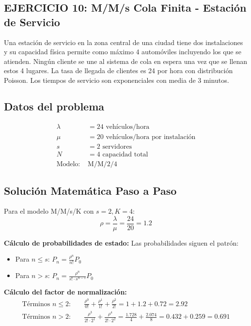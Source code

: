 \documentclass[12pt, a4paper, oneside]{book}
\theoremstyle{definition}
\begin{document}
\begin{center}
\begin{center}
\begin{center}
\section{EJERCICIO 10: M/M/s Cola Finita - Estación de Servicio}

Una estación de servicio en la zona central de una ciudad tiene dos instalaciones y su capacidad física permite como máximo 4 automóviles incluyendo los que se atienden. Ningún cliente se une al sistema de cola en espera una vez que se llenan estos 4 lugares. La tasa de llegada de clientes es 24 por hora con distribución Poisson. Los tiempos de servicio son exponenciales con media de 3 minutos.

\subsection{Datos del problema}
\begin{align*}
\lambda &= 24 \text{ vehículos/hora} \\
\mu &= 20 \text{ vehículos/hora por instalación} \\
s &= 2 \text{ servidores} \\
N &= 4 \text{ capacidad total} \\
\text{Modelo: } &\text{M/M/2/4}
\end{align*}

\subsection{Solución Matemática Paso a Paso}

Para el modelo M/M/s/K con $s=2, K=4$:
$$\rho = \frac{\lambda}{\mu} = \frac{24}{20} = 1.2$$

\textbf{Cálculo de probabilidades de estado:}
Las probabilidades siguen el patrón:
\begin{itemize}
\item Para $n \leq s$: $P_n = \frac{\rho^n}{n!} P_0$
\item Para $n > s$: $P_n = \frac{\rho^n}{s! \cdot s^{n-s}} P_0$
\end{itemize}

\textbf{Cálculo del factor de normalización:}
\begin{align*}
\text{Términos } n \leq 2: &\quad \frac{\rho^0}{0!} + \frac{\rho^1}{1!} + \frac{\rho^2}{2!} = 1 + 1.2 + 0.72 = 2.92 \\
\text{Términos } n > 2: &\quad \frac{\rho^3}{2! \cdot 2^1} + \frac{\rho^4}{2! \cdot 2^2} = \frac{1.728}{4} + \frac{2.074}{8} = 0.432 + 0.259 = 0.691
\end{align*}


\end{center}
\end{center}
\end{center}
\end{document}
